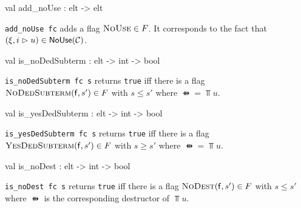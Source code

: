 \begin{ocamldocsigend}
\begin{ocamldocdescription}
\end{ocamldocdescription}


\label{val:Constraint.Frame.add-underscorenoUse}\begin{ocamldoccode}
val add_noUse : elt -> elt
\end{ocamldoccode}
\begin{ocamldocdescription}
{\tt{add\_noUse fc}} adds a flag $\textsc{NoUse} \in F$. 
      It corresponds to the fact that $(\xi, i \vartriangleright u) \in \mathsf{NoUse}(\mathcal{C})$. 


\end{ocamldocdescription}


\label{val:Constraint.Frame.is-underscorenoDedSubterm}\begin{ocamldoccode}
val is_noDedSubterm : elt -> int -> bool
\end{ocamldoccode}
\begin{ocamldocdescription}
{\tt{is\_noDedSubterm fc s}} returns {\tt{true}} iff there is a flag $\textsc{NoDedSubterm}(\mathsf{f},s') \in F$ with $s \leq s'$
      where $\ffun = \Top{u}$. 


\end{ocamldocdescription}


\label{val:Constraint.Frame.is-underscoreyesDedSubterm}\begin{ocamldoccode}
val is_yesDedSubterm : elt -> int -> bool
\end{ocamldoccode}
\begin{ocamldocdescription}
{\tt{is\_yesDedSubterm fc s}} returns {\tt{true}} iff there is a flag $\textsc{YesDedSubterm}(\mathsf{f},s') \in F$ with $s \geq s'$
      where $\ffun = \Top{u}$. 


\end{ocamldocdescription}


\label{val:Constraint.Frame.is-underscorenoDest}\begin{ocamldoccode}
val is_noDest : elt -> int -> bool
\end{ocamldoccode}
\begin{ocamldocdescription}
{\tt{is\_noDest fc s}} returns {\tt{true}} iff there is a flag $\textsc{NoDest}(\mathsf{f},s') \in F$ with $s \leq s'$
      where $\ffun$ is the corresponding destructor of $\Top{u}$. 


\end{ocamldocdescription}



\end{ocamldocsigend}
